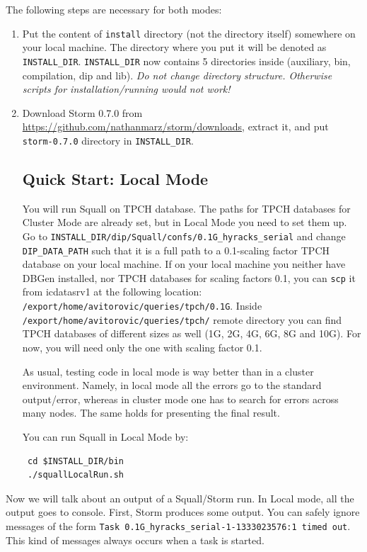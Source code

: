 \documentclass[a4paper,10pt]{article}
\begin{document}
The following steps are necessary for both modes:
\begin{enumerate}
 \item Put the content of \verb#install# directory (not the directory itself) somewhere on your local machine. The directory where you put it will be denoted as \verb#INSTALL_DIR#. \verb#INSTALL_DIR# now contains 5 directories inside (auxiliary, bin, compilation, dip and lib). \textit{Do not change directory structure. Otherwise scripts for installation/running would not work!}
 \item Download Storm 0.7.0 from \url{https://github.com/nathanmarz/storm/downloads}, extract it, and put \verb#storm-0.7.0# directory in \verb#INSTALL_DIR#.
 
\subsection{Quick Start: Local Mode}
You will run Squall on TPCH database. The paths for TPCH databases for Cluster Mode are already set, but in Local Mode you need to set them up. Go to \verb#INSTALL_DIR/dip/Squall/confs/0.1G_hyracks_serial# and change \verb#DIP_DATA_PATH# such that it is a full path to a 0.1-scaling factor TPCH database on your local machine. If on your local machine you neither have DBGen installed, nor TPCH databases for scaling factors 0.1, you can \verb#scp# it from icdatasrv1 at the following location: \\ \verb#/export/home/avitorovic/queries/tpch/0.1G#. Inside \\ \verb#/export/home/avitorovic/queries/tpch/# remote directory you can find TPCH databases of different sizes as well (1G, 2G, 4G, 6G, 8G and 10G). For now, you will need only the one with scaling factor 0.1.

As usual, testing code in local mode is way better than in a cluster environment. Namely, in local mode all the errors go to the standard output/error, whereas in cluster mode one has to search for errors across many nodes. The same holds for presenting the final result.

You can run Squall in Local Mode by:
\begin{verbatim}
 cd $INSTALL_DIR/bin
 ./squallLocalRun.sh
\end{verbatim}
\end{enumerate}

Now we will talk about an output of a Squall/Storm run. In Local mode, all the output goes to console. First, Storm produces some output. You can safely ignore messages of the form \verb#Task 0.1G_hyracks_serial-1-1333023576:1 timed out#. This kind of messages always occurs when a task is started.
\end{document}
